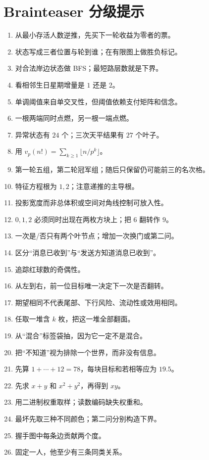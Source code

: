 \chapter{Brainteaser 分级提示}
\begin{enumerate}[leftmargin=*]
  \item 从最小存活人数逆推，先买下一轮收益为零者的票。
  \item 状态写成三者位置与轮到谁；在有限图上做胜负标记。
  \item 对合法岸边状态做 BFS；最短路层数就是下界。
  \item 看相邻生日星期增量是 $1$ 还是 $2$。
  \item 单调阈值来自单交叉性，但阈值依赖支付矩阵和信念。
  \item 一根两端同时点燃，另一根一端点燃。
  \item 异常状态有 $24$ 个；三次天平结果有 $27$ 个叶子。
  \item 用 $v_p(n!)=\sum_{k\ge1}\lfloor n/p^k\rfloor$。
  \item 第一轮五组，第二轮冠军组；随后只保留仍可能前三的名次格。
  \item 特征方程根为 $1,2$；注意递推的主导根。
  \item 投影宽度而非总体积或空间对角线控制可放入性。
  \item $0,1,2$ 必须同时出现在两枚方块上；把 $6$ 翻转作 $9$。
  \item 一次是/否只有两个叶节点；增加一次换门或第二问。
  \item 区分“消息已收到”与“发送方知道消息已收到”。
  \item 追踪红球数的奇偶性。
  \item 从左到右，前一位目标唯一决定下一次是否翻转。
  \item 期望相同不代表尾部、下行风险、流动性或效用相同。
  \item 任取一堆含 $k$ 枚，把这一堆全部翻面。
  \item 从“混合”标签袋抽，因为它一定不是混合。
  \item 把“不知道”视为排除一个世界，而非没有信息。
  \item 先算 $1+\cdots+12=78$，每块目标和若相等应为 $19.5$。
  \item 先求 $x+y$ 和 $x^2+y^2$，再得到 $xy$。
  \item 用二进制权重取样；读数编码缺失权重和。
  \item 最坏先取三种不同颜色；第二问分别构造下界。
  \item 握手图中每条边贡献两个度。
  \item 固定一人，他至少有三条同类关系。

\end{enumerate}
